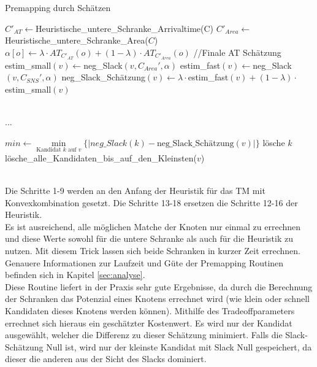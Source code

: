 \documentclass[11pt, a4paper, german]{article}
\begin{document}
\begin{algorithm}[H]
 \LinesNumbered
 \DontPrintSemicolon
 \caption{Premapping durch Schätzen}
 $C'_{AT} \gets $Heuristische\_untere\_Schranke\_Arrivaltime(C)\;
$C'_{Area} \gets$ Heuristische\_untere\_Schranke\_Area($C$)\; 
{
	$\alpha[o] \gets \lambda \cdot AT_{C'_{AT}}(o) + (1-\lambda)\cdot AT_{C'_{Area}}(o)$ //Finale AT Sch\"atzung \;
}
 {
  estim\_small$(v) \gets $neg\_Slack$(v,C_{Area}',\alpha)$\;
  estim\_fast$(v) \gets $neg\_Slack$(v,C_{SNS}',\alpha)$\;
  neg\_Slack\_Sch\"atzung$(v) \gets \lambda \cdot $estim\_fast$(v) + (1-\lambda)\cdot$estim\_small$(v)$\;
 }
 
\ \\...\\ \;
 
  {
    $min \gets \min\limits_{\text{Kandidat }k\text{ auf }v}\{|neg\_Slack(k)-\text{neg\_Slack\_Sch\"atzung}(v)|\}$\;
    {
      {
	l\"osche $k$\;
      }
    }
    {
      lösche\_alle\_Kandidaten\_bis\_auf\_den\_Kleinsten($v$)\;
      }
   }
\end{algorithm}\ \\
 
Die Schritte 1-9 werden an den Anfang der Heuristik für das TM mit Konvexkombination gesetzt. Die Schritte 13-18 ersetzen die Schritte 12-16 der Heuristik.\\ 
Es ist ausreichend, alle möglichen Matche der Knoten nur einmal zu errechnen und diese Werte sowohl für die untere Schranke als auch für die Heuristik zu nutzen. Mit diesem Trick lassen sich beide Schranken in kurzer Zeit errechnen. Genauere Informationen zur Laufzeit und Güte der Premapping Routinen befinden sich in Kapitel \ref{sec:analyse}.\\
Diese Routine liefert in der Praxis sehr gute Ergebnisse, da durch die Berechnung der Schranken das Potenzial eines Knotens errechnet wird (wie klein oder schnell Kandidaten dieses Knotens werden können). Mithilfe des Tradeoffparameters errechnet sich hieraus ein geschätzter Kostenwert. Es wird nur der Kandidat ausgewählt, welcher die Differenz zu dieser Schätzung minimiert. Falls die Slack-Schätzung Null ist, wird nur der kleinste Kandidat mit Slack Null gespeichert, da dieser die anderen aus der Sicht des Slacks dominiert.
\end{document}

